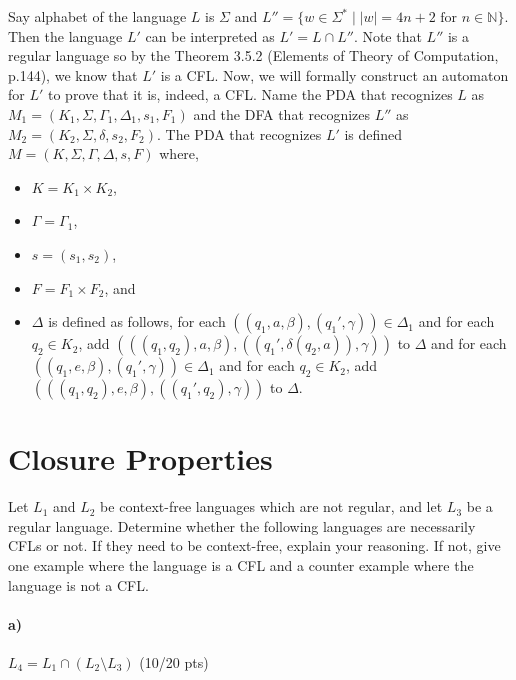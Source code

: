 \documentclass[a4paper,12pt]{article}
\begin{document}
\begin{tcolorbox}
Say alphabet of the language $L$ is $\Sigma$ and $L'' = \{w \in \Sigma^* \mid |w| = 4n + 2 \text{ for } n \in \mathbb{N}\}$. Then the language $L'$ can be interpreted as $L' = L \cap L''$. Note that $L''$ is a regular language so by the Theorem 3.5.2 (Elements of Theory of Computation, p.144), we know that $L'$ is a CFL. Now, we will formally construct an automaton for $L'$ to prove that it is, indeed, a CFL. Name the PDA that recognizes $L$ as $M_1 = (K_1, \Sigma, \Gamma_1, \Delta_1, s_1, F_1)$ and the DFA that recognizes $L''$ as $M_2 = (K_2, \Sigma, \delta, s_2, F_2)$. The PDA that recognizes $L'$ is defined $M = (K, \Sigma, \Gamma, \Delta, s, F)$ where,
\begin{itemize}
	\item $K = K_1 \times K_2$,
	\item $\Gamma = \Gamma_1$,
	\item $s = (s_1, s_2)$,
	\item $F = F_1 \times F_2$, and
	\item $\Delta$ is defined as follows, for each $((q_1, a, \beta), (q_1', \gamma)) \in \Delta_1$ and for each $q_2 \in K_2$, add $(((q_1, q_2), a, \beta), ((q_1', \delta(q_2, a)), \gamma))$ to $\Delta$ and  for each $((q_1, e, \beta), (q_1', \gamma)) \in \Delta_1$ and for each $q_2 \in K_2$, add $(((q_1, q_2), e, \beta), ((q_1', q_2), \gamma))$ to $\Delta$.
\end{itemize}
\end{tcolorbox}






\newpage
\section{Closure Properties \hfill {}}

Let $L_1$ and $L_2$ be context-free languages which are not regular, and let $L_3$ be a regular language. Determine whether the following languages are necessarily CFLs or not. If they need to be context-free, explain your reasoning. If not, give one example where the language is a CFL and a counter example where the language is not a CFL. \\

\paragraph{a)} $L_4 = L_1 \cap (L_2 \setminus L_3)$ \hfill \small{(10/20 pts)} \\
\end{document}
